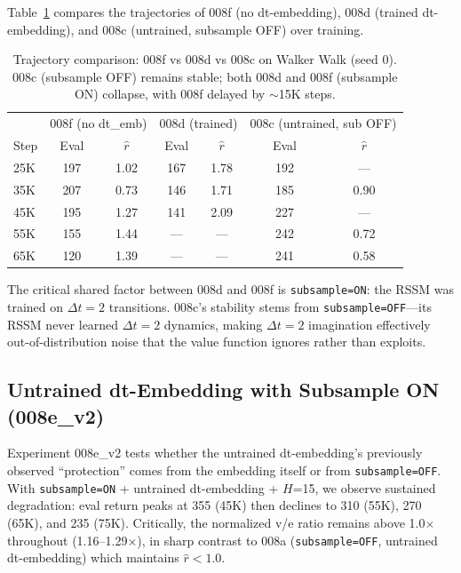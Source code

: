 \documentclass[10pt,letterpaper]{article}
\newcommand{\dt}{\Delta t}
\begin{document}
Table~\ref{tab:008f_trajectory} compares the trajectories of 008f (no dt-embedding), 008d (trained dt-embedding), and 008c (untrained, subsample OFF) over training.

\begin{table}[t]
\centering
\caption{Trajectory comparison: 008f vs 008d vs 008c on Walker Walk (seed 0). 008c (subsample OFF) remains stable; both 008d and 008f (subsample ON) collapse, with 008f delayed by $\sim$15K steps.}
\label{tab:008f_trajectory}
\small
\begin{tabular}{l cc cc cc}
\toprule
& \multicolumn{2}{c}{008f (no dt\_emb)} & \multicolumn{2}{c}{008d (trained)} & \multicolumn{2}{c}{008c (untrained, sub OFF)} \\
Step & Eval & $\hat{r}$ & Eval & $\hat{r}$ & Eval & $\hat{r}$ \\
\midrule
25K & 197 & 1.02 & 167 & 1.78 & 192 & --- \\
35K & 207 & 0.73 & 146 & 1.71 & 185 & 0.90 \\
45K & 195 & 1.27 & 141 & 2.09 & 227 & --- \\
55K & 155 & 1.44 & --- & --- & 242 & 0.72 \\
65K & 120 & 1.39 & --- & --- & 241 & 0.58 \\
\bottomrule
\end{tabular}
\end{table}

The critical shared factor between 008d and 008f is \texttt{subsample=ON}: the RSSM was trained on $\dt=2$ transitions.
008c's stability stems from \texttt{subsample=OFF}---its RSSM never learned $\dt=2$ dynamics, making $\dt=2$ imagination effectively out-of-distribution noise that the value function ignores rather than exploits.

\subsection{Untrained dt-Embedding with Subsample ON (008e\_v2)}\label{sec:008e_v2}

Experiment 008e\_v2 tests whether the untrained dt-embedding's previously observed ``protection'' comes from the embedding itself or from \texttt{subsample=OFF}.
With \texttt{subsample=ON} + untrained dt-embedding + $H$=15, we observe sustained degradation: eval return peaks at 355 (45K) then declines to 310 (55K), 270 (65K), and 235 (75K).
Critically, the normalized v/e ratio remains above 1.0$\times$ throughout (1.16--1.29$\times$), in sharp contrast to 008a (\texttt{subsample=OFF}, untrained dt-embedding) which maintains $\hat{r} < 1.0$.
\end{document}
